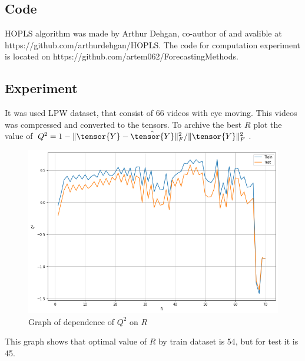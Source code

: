 \documentclass[../../main.tex]{subfiles}
\begin{document}
\subsection{Code}

HOPLS algorithm was made by Arthur Dehgan, co-author of \cite{HOPLS} and avalible at  https://github.com/arthurdehgan/HOPLS.
The code for computation experiment is located on https://github.com/artem062/ForecastingMethods.

\subsection{Experiment}

It was used LPW dataset, that consist of 66 videos with eye moving. This videos was compressed and converted to the tensors. To archive the best $R$ plot the value of $Q^2 = 1 - \|\tensor{Y} - \hat{\tensor{Y}}\|^2_F / \|\tensor{Y}\|^2_F$.

\begin{figure}[h!]
\centering
\includegraphics[width=1.0\textwidth]{figures/plot}
\caption{Graph of dependence of $Q^2$ on $R$}
\label{fig:eye_pred:3}
\end{figure}

This graph shows that optimal value of $R$ by train dataset is 54, but for test it is 45.
\end{document}
